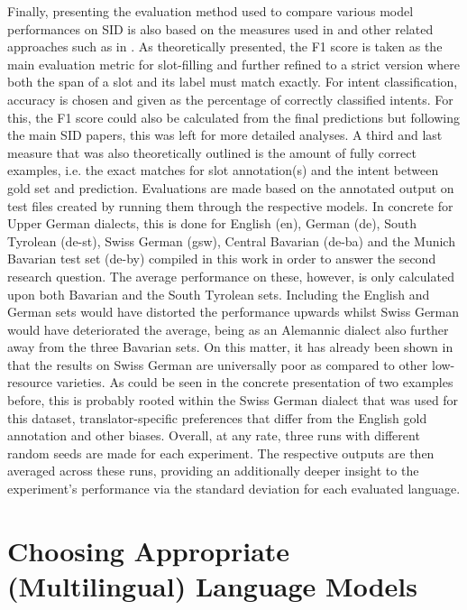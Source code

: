 \documentclass[11pt,a4paper,twoside,openright]{scrbook}
\begin{document}
Finally, presenting the evaluation method used to compare various model performances on SID is also based on the measures used in \citet{van-der-goot-etal-2021-masked} and other related approaches such as in \citet{2023-findings-vardial}. As theoretically presented, the F1 score is taken as the main evaluation metric for slot-filling and further refined to a strict version where both the span of a slot and its label must match exactly. For intent classification, accuracy is chosen and given as the percentage of correctly classified intents. For this, the F1 score could also be calculated from the final predictions but following the main SID papers, this was left for more detailed analyses. A third and last measure that was also theoretically outlined is the amount of fully correct examples, i.e. the exact matches for slot annotation(s) and the intent between gold set and prediction. Evaluations are made based on the annotated output on test files created by running them through the respective models. In concrete for Upper German dialects, this is done for English (en), German (de), South Tyrolean (de-st), Swiss German (gsw), Central Bavarian (de-ba) and the Munich Bavarian test set (de-by) compiled in this work in order to answer the second research question. The average performance on these, however, is only calculated upon both Bavarian and the South Tyrolean sets. Including the English and German sets would have distorted the performance upwards whilst Swiss German would have deteriorated the average, being as an Alemannic dialect also further away from the three Bavarian sets. On this matter, it has already been shown in \citet{2023-findings-vardial} that the results on Swiss German are universally poor as compared to other low-resource varieties. As could be seen in the concrete presentation of two examples before, this is probably rooted within the Swiss German dialect that was used for this dataset, translator-specific preferences that differ from the English gold annotation and other biases. Overall, at any rate, three runs with different random seeds are made for each experiment. The respective outputs are then averaged across these runs, providing an additionally deeper insight to the experiment's performance via the standard deviation for each evaluated language.







\section{Choosing Appropriate (Multilingual) Language Models}
\end{document}
